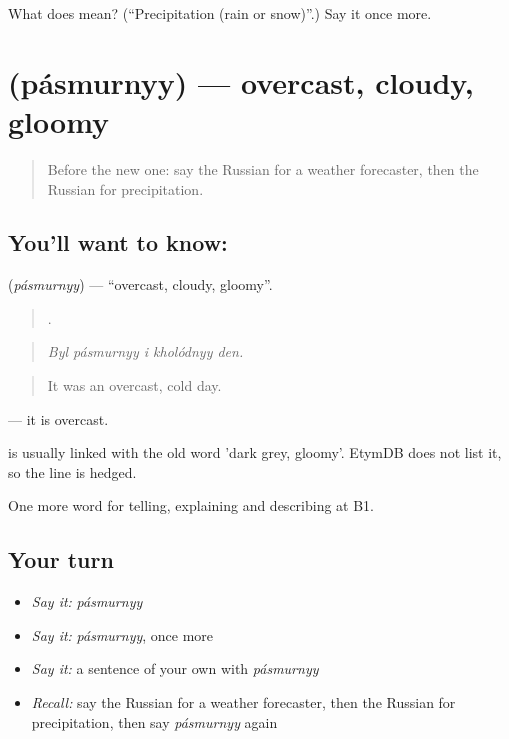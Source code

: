 \begin{tcolorbox}[breakable,colback=teal!4,colframe=teal!35!black,title={Before you move on}]
What does  mean? (\textquotedblleft{}Precipitation (rain or snow)\textquotedblright{}.) Say it once more.
\end{tcolorbox}
\section[\texorpdfstring{\ru{пасмурный} (pásmurnyy)}{пасмурный (pásmurnyy)}]{ (pásmurnyy) — overcast, cloudy, gloomy}

\label{lesson:RU-C464-pasmurnyy}



\begin{quote}
Before the new one: say the Russian for a weather forecaster, then the Russian for precipitation.
\end{quote}

\subsection*{You'll want to know: }
\textbf{} (\emph{pásmurnyy}) — \textquotedblleft{}overcast, cloudy, gloomy\textquotedblright{}.

\begin{quote}
    .
\end{quote}

\begin{quote}
\emph{Byl pásmurnyy i kholódnyy den.}
\end{quote}

\begin{quote}
It was an overcast, cold day.
\end{quote}

\emph{} — it is overcast.

\begin{cousinweb}
\emph{} is usually linked with the old word \emph{} 'dark grey, gloomy'. EtymDB does not list it, so the line is hedged.
\end{cousinweb}

\begin{grammarlens}[title={What you've built}]
One more word for telling, explaining and describing at B1.
\end{grammarlens}

\subsection*{Your turn}
\begin{itemize}
\raggedright
  \item \emph{Say it:} \emph{pásmurnyy}
  \item \emph{Say it:} \emph{pásmurnyy}, once more
  \item \emph{Say it:} a sentence of your own with \emph{pásmurnyy}
  \item \emph{Recall:} say the Russian for a weather forecaster, then the Russian for precipitation, then say \emph{pásmurnyy} again
\end{itemize}

